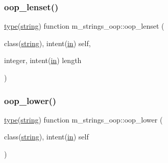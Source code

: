 \mbox{\label{namespacem__strings__oop_ac8ca18186659b8759b08e5167a3effb5}} 
\subsubsection{\texorpdfstring{oop\+\_\+lenset()}{oop\_lenset()}}
{\footnotesize\ttfamily \hyperlink{stop__watch_83_8txt_a70f0ead91c32e25323c03265aa302c1c}{type}(\hyperlink{structm__strings__oop_1_1string}{string}) function m\+\_\+strings\+\_\+oop\+::oop\+\_\+lenset (\begin{DoxyParamCaption}\item[{class(\hyperlink{structm__strings__oop_1_1string}{string}), intent(\hyperlink{M__journal_83_8txt_afce72651d1eed785a2132bee863b2f38}{in})}]{self,  }\item[{integer, intent(\hyperlink{M__journal_83_8txt_afce72651d1eed785a2132bee863b2f38}{in})}]{length }\end{DoxyParamCaption})\hspace{0.3cm}{\ttfamily [private]}}

\mbox{\label{namespacem__strings__oop_ad49fed83544ede7b94948dee326ca3d7}} 
\subsubsection{\texorpdfstring{oop\+\_\+lower()}{oop\_lower()}}
{\footnotesize\ttfamily \hyperlink{stop__watch_83_8txt_a70f0ead91c32e25323c03265aa302c1c}{type}(\hyperlink{structm__strings__oop_1_1string}{string}) function m\+\_\+strings\+\_\+oop\+::oop\+\_\+lower (\begin{DoxyParamCaption}\item[{class(\hyperlink{structm__strings__oop_1_1string}{string}), intent(\hyperlink{M__journal_83_8txt_afce72651d1eed785a2132bee863b2f38}{in})}]{self }\end{DoxyParamCaption})\hspace{0.3cm}{\ttfamily [private]}}

\mbox{\label{namespacem__strings__oop_ab88f5f814c08f1c93c95fcd0ba2a6779}} 
